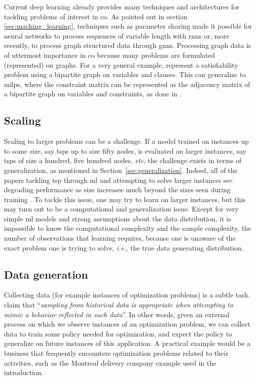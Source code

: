 \documentclass[11pt]{article}
\begin{document}
		Current deep learning already provides many techniques and architectures for tackling problems of
		interest in \gls{co}.
		As pointed out in section \ref{sec:maching_learning}, techniques such as parameter sharing made it
		possible for neural networks to process sequences of variable length with \glspl{rnn} or, more
		recently, to process graph structured data through \glspl{gnn}.
		Processing graph data is of uttermost importance in \gls{co} because many problems are formulated
		(represented) on graphs.
		For a very general example, \cite{SelsamLearningSATSolver2018} represent a satisfiability problem
		using a bipartite graph on variables and clauses.
		This can generalize to \glspl{milp}, where the constraint matrix can be represented as the
		adjacency matrix of a bipartite graph on variables and constraints, as done in
		\cite{GasseExact2019}.

	\subsection{Scaling}
		Scaling to larger problems can be a challenge.
		If a model trained on instances up to some size, say \glspl{tsp} up to size fifty nodes, is
		evaluated on larger instances, say \glspl{tsp} of size a hundred, five hundred nodes, \textit{etc},
		the challenge exists in terms of generalization, as mentioned in Section~\ref{sec:generalization}.
		Indeed, all of the papers tackling \gls{tsp} through \gls{ml} and attempting to solve larger
		instances see degrading performance as size increases much beyond the sizes seen during training \citep{VinyalsPointerNetworks2015,
	    BelloNeuralCombinatorialOptimization2016, KhalilLearningCombinatorialOptimization2017,
		KoolAttentionSolvesYour2018}.
		To tackle this issue, one may try to learn on larger instances, but this may turn out to be a
		computational and generalization issue.
		Except for very simple \gls{ml} models and strong assumptions about the data distribution, it is
		impossible to know the computational complexity and the sample complexity,  the number
		of observations that learning requires, because one is unaware of the exact problem one is trying
		to solve, \textit{i.e.}, the true data generating distribution.

	\subsection{Data generation}
		Collecting data (for example instances of optimization problems) is a subtle task.
		\cite{LarsenPredictingSolutionSummaries2018} claim that ``\textit{sampling from historical
		data is appropriate when attempting to mimic a behavior reflected in such data}''.
		In other words, given an external process on which we observe instances of an optimization problem,
		we can collect data to train some policy needed for optimization, and expect the policy to
		generalize on future instances of this application.
		A practical example would be a business that frequently encounters optimization problems related to
		their activities, such as the Montreal delivery company example used in the introduction.
\end{document}
